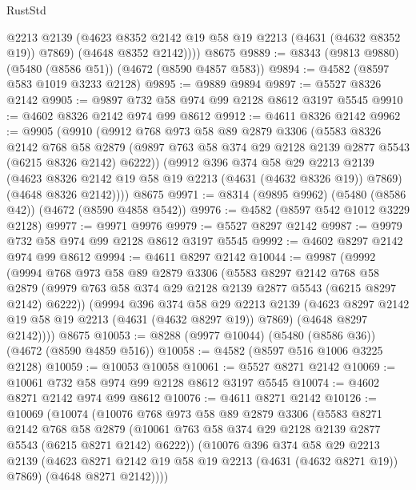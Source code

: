 \begin{lexlean}{RustStd}
\begin{coremodule}
          @2213
          @2139
          (@4623 @8352 @2142 @19 @58 @19 @2213 (@4631 (@4632 @8352 @19)) @7869)
          (@4648 @8352 @2142))))
    @8675
@9889 := @8343 (@9813 @9880) (@5480 (@8586 @51)) (@4672 (@8590 @4857 @583))
@9894 := @4582 (@8597 @583 @1019 @3233 @2128)
@9895 := @9889 @9894
@9897 := @5527 @8326 @2142
@9905 := @9897 @732 @58 @974 @99 @2128 @8612 @3197 @5545
@9910 := @4602 @8326 @2142 @974 @99 @8612
@9912 := @4611 @8326 @2142
@9962 := @9905
    (@9910
      (@9912
        @768
        @973
        @58
        @89
        @2879
        @3306
        (@5583
          @8326
          @2142
          @768
          @58
          @2879
          (@9897 @763 @58 @374 @29 @2128 @2139 @2877 @5543 (@6215 @8326 @2142) @6222))
        (@9912
          @396
          @374
          @58
          @29
          @2213
          @2139
          (@4623 @8326 @2142 @19 @58 @19 @2213 (@4631 (@4632 @8326 @19)) @7869)
          (@4648 @8326 @2142))))
    @8675
@9971 := @8314 (@9895 @9962) (@5480 (@8586 @42)) (@4672 (@8590 @4858 @542))
@9976 := @4582 (@8597 @542 @1012 @3229 @2128)
@9977 := @9971 @9976
@9979 := @5527 @8297 @2142
@9987 := @9979 @732 @58 @974 @99 @2128 @8612 @3197 @5545
@9992 := @4602 @8297 @2142 @974 @99 @8612
@9994 := @4611 @8297 @2142
@10044 := @9987
    (@9992
      (@9994
        @768
        @973
        @58
        @89
        @2879
        @3306
        (@5583
          @8297
          @2142
          @768
          @58
          @2879
          (@9979 @763 @58 @374 @29 @2128 @2139 @2877 @5543 (@6215 @8297 @2142) @6222))
        (@9994
          @396
          @374
          @58
          @29
          @2213
          @2139
          (@4623 @8297 @2142 @19 @58 @19 @2213 (@4631 (@4632 @8297 @19)) @7869)
          (@4648 @8297 @2142))))
    @8675
@10053 := @8288 (@9977 @10044) (@5480 (@8586 @36)) (@4672 (@8590 @4859 @516))
@10058 := @4582 (@8597 @516 @1006 @3225 @2128)
@10059 := @10053 @10058
@10061 := @5527 @8271 @2142
@10069 := @10061 @732 @58 @974 @99 @2128 @8612 @3197 @5545
@10074 := @4602 @8271 @2142 @974 @99 @8612
@10076 := @4611 @8271 @2142
@10126 := @10069
    (@10074
      (@10076
        @768
        @973
        @58
        @89
        @2879
        @3306
        (@5583
          @8271
          @2142
          @768
          @58
          @2879
          (@10061 @763 @58 @374 @29 @2128 @2139 @2877 @5543 (@6215 @8271 @2142) @6222))
        (@10076
          @396
          @374
          @58
          @29
          @2213
          @2139
          (@4623 @8271 @2142 @19 @58 @19 @2213 (@4631 (@4632 @8271 @19)) @7869)
          (@4648 @8271 @2142))))

\end{coremodule}
\end{lexlean}
